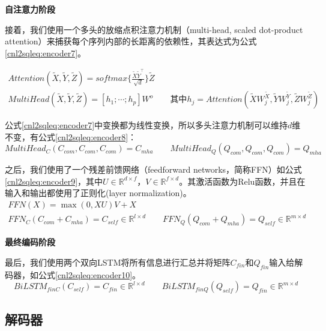 \textbf{自注意力阶段}

接着，我们使用一个多头的放缩点积注意力机制（multi-head, scaled dot-product attention）\cite{vaswani2017attention}来捕获每个序列内部的长距离的依赖性，其表达式为公式\ref{cnl2sqleq:encoder7}。

\begin{gather}
  \label{cnl2sqleq:encoder7}
  Attention(\widetilde{X},\widetilde{Y},\widetilde{Z}) = softmax\{\frac{\widetilde{X}\widetilde{Y}^{\top}}{\sqrt{d}}\} \widetilde{Z}\\
  MultiHead(\widetilde{X},\widetilde{Y},\widetilde{Z}) = [h_1;\cdots;h_p]W^o \qquad \mbox{其中}h_j= Attention(\widetilde{X}W^{\widetilde{X}}_j,\widetilde{Y}W^{\widetilde{Y}}_j,\widetilde{Z}W^{\widetilde{Z}}_j)
\end{gather}

公式\ref{cnl2sqleq:encoder7}中变换都为线性变换，所以多头注意力机制可以维持$d$维不变，有公式\ref{cnl2sqleq:encoder8}：
\begin{equation}
  \label{cnl2sqleq:encoder8}
  MultiHead_C(C_{com},C_{com},C_{com}) = C_{mha} \qquad MultiHead_Q(Q_{com},Q_{com},Q_{com}) = Q_{mha}
 \end{equation}

之后，我们使用了一个残差前馈网络（feedforward networks，简称FFN）如公式\ref{cnl2sqleq:encoder9}，其中$U \in \mathbb{R}^{d \times f}$，$V \in \mathbb{R}^{f \times d}$。其激活函数为Relu函数\cite{Nair2010Rectified,vaswani2017attention}，并且在输入和输出都使用了正则化(layer normalization)\cite{Ba2016Layer}。
\begin{gather}
  \label{cnl2sqleq:encoder9}
  FFN(X) = \max(0,XU)V + X\\
  FFN_C(C_{com} + C_{mha}) = C_{self} \in \mathbb{R}^{l \times d} \qquad FFN_Q(Q_{com} + Q_{mha}) = Q_{self} \in \mathbb{R}^{m \times d}
\end{gather}

\textbf{最终编码阶段}

最后，我们使用两个双向LSTM将所有信息进行汇总并将矩阵$C_{fin}$和$Q_{fin}$输入给解码器，如公式\ref{cnl2sqleq:encoder10}。
\begin{equation}
  \label{cnl2sqleq:encoder10}
  BiLSTM_{finC}(C_{self}) = C_{fin} \in \mathbb{R}^{l \times d} \qquad BiLSTM_{finQ}(Q_{self}) = Q_{fin} \in \mathbb{R}^{m \times d} 
\end{equation}


\subsection{解码器}
\label{cnl2sql:decoder}

